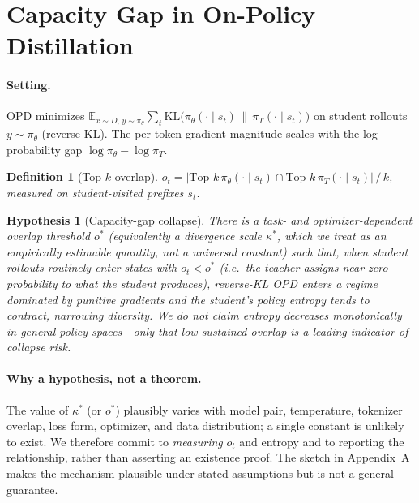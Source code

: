 \documentclass[11pt]{article}
\newtheorem{hypothesis}{Hypothesis}
\newtheorem{definition}{Definition}
\begin{document}
\section{Capacity Gap in On-Policy Distillation}
\label{sec:gap}

\paragraph{Setting.} OPD minimizes $\mathbb{E}_{x\sim D,\,y\sim\pi_\theta}\sum_t \mathrm{KL}\!\big(\pi_\theta(\cdot\mid s_t)\,\|\,\pi_T(\cdot\mid s_t)\big)$ on student rollouts $y\sim\pi_\theta$ (reverse KL). The per-token gradient magnitude scales with the log-probability gap $\log\pi_\theta-\log\pi_T$.

\begin{definition}[Top-$k$ overlap]\label{def:overlap}
$o_t = \big|\mathrm{Top}\text{-}k\,\pi_\theta(\cdot\mid s_t)\cap \mathrm{Top}\text{-}k\,\pi_T(\cdot\mid s_t)\big|\,/\,k$, measured on \emph{student-visited} prefixes $s_t$.
\end{definition}

\begin{hypothesis}[Capacity-gap collapse]\label{hyp:collapse}
There is a task- and optimizer-dependent overlap threshold $o^\ast$ (equivalently a divergence scale $\kappa^\ast$, which we treat as an \emph{empirically estimable quantity, not a universal constant}) such that, when student rollouts routinely enter states with $o_t<o^\ast$ (i.e.\ the teacher assigns near-zero probability to what the student produces), reverse-KL OPD enters a regime dominated by punitive gradients and the student's policy entropy tends to contract, narrowing diversity. We do \emph{not} claim entropy decreases monotonically in general policy spaces---only that low sustained overlap is a leading indicator of collapse risk.
\end{hypothesis}

\paragraph{Why a hypothesis, not a theorem.} The value of $\kappa^\ast$ (or $o^\ast$) plausibly varies with model pair, temperature, tokenizer overlap, loss form, optimizer, and data distribution; a single constant is unlikely to exist. We therefore commit to \emph{measuring} $o_t$ and entropy and to reporting the relationship, rather than asserting an existence proof. The sketch in Appendix~A makes the mechanism plausible under stated assumptions but is not a general guarantee.
\end{document}
